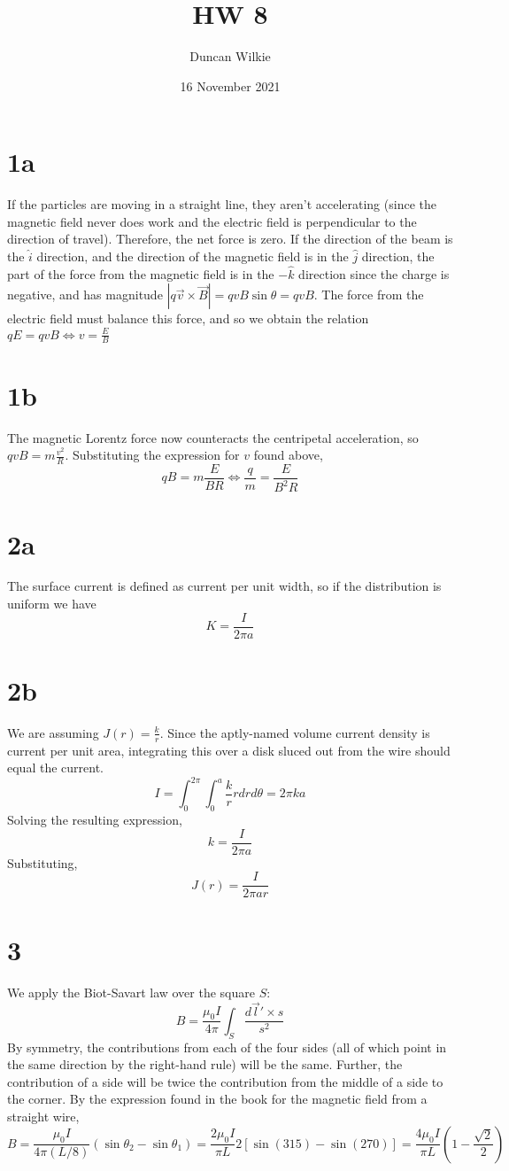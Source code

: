 \documentclass{article}\usepackage{amsmath}
\title{HW 8}
\date{16 November 2021}
\author{Duncan Wilkie}
\begin{document}
\maketitle

\section*{1a}
If the particles are moving in a straight line, they aren't accelerating (since the magnetic field never does work and the electric field is perpendicular to the direction of travel). Therefore, the net force is zero. If the direction of the beam is the $\hat{i}$ direction, and the direction of the magnetic field is in the $\hat{j}$ direction, the part of the force from the magnetic field is in the $-\hat{k}$ direction since the charge is negative, and has magnitude $|q\vec{v}\times\vec{B}|=qvB\sin\theta=qvB$. The force from the electric field must balance this force, and so we obtain the relation $qE=qvB\Leftrightarrow v=\frac{E}{B}$

\section*{1b}
The magnetic Lorentz force now counteracts the centripetal acceleration, so
$qvB=m\frac{v^2}{R}$. Substituting the expression for $v$ found above,
\[qB=m\frac{E}{BR}\Leftrightarrow \frac{q}{m}=\frac{E}{B^2R}\]

\section*{2a}
The surface current is defined as current per unit width, so if the distribution is uniform we have
\[K=\frac{I}{2\pi a}\]

\section*{2b}
We are assuming $J(r)=\frac{k}{r}$. Since the aptly-named volume current density is current per unit area, integrating this over a disk sluced out from the wire should equal the current.
\[I=\int_0^{2\pi}\int_0^a\frac{k}{r}rdrd\theta=2\pi ka\]
Solving the resulting expression,
\[k=\frac{I}{2\pi a}\]
Substituting,
\[J(r)=\frac{I}{2\pi a r}\]

\section*{3}
We apply the Biot-Savart law over the square $S$:
\[B=\frac{\mu_0 I}{4\pi}\int_S\frac{d\vec{l}'\times \hat{s}}{s^2}\]
By symmetry, the contributions from each of the four sides (all of which point in the same direction by the right-hand rule) will be the same. Further, the contribution of a side will be twice the contribution from the middle of a side to the corner. By the expression found in the book for the magnetic field from a straight wire,
\[B=\frac{\mu_0 I}{4\pi(L/8)}\left( \sin\theta_2-\sin\theta_1 \right)=\frac{2\mu_0 I}{\pi L}2[\sin(315)-\sin(270)]=\frac{4\mu_0 I}{\pi L}\left( 1-\frac{\sqrt{2}}{2} \right)\]
\end{document}
